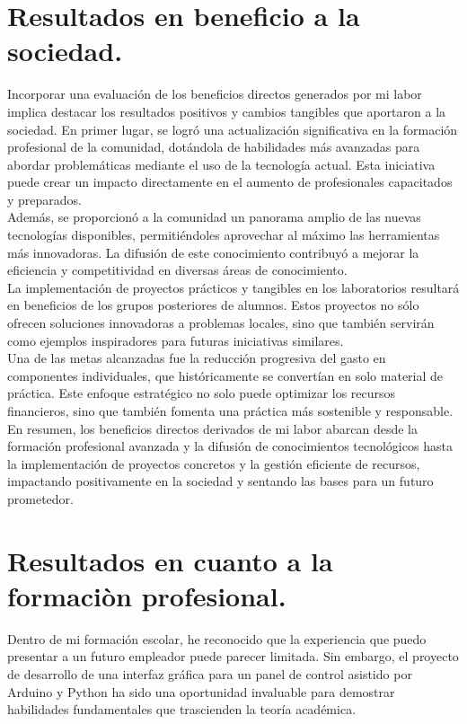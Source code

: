 \documentclass[a4paper,12pt]{article}
\begin{document}
    \section{Resultados en beneficio a la sociedad.}
    Incorporar una evaluación de los beneficios directos generados por mi labor implica destacar los resultados positivos y cambios tangibles que aportaron a la sociedad. En primer lugar, se logró una actualización significativa en la formación profesional de la comunidad, dotándola de habilidades más avanzadas para abordar problemáticas mediante el uso de la tecnología actual. Esta iniciativa puede crear un impacto directamente en el aumento de profesionales capacitados y preparados.\\
    Además, se proporcionó a la comunidad un panorama amplio de las nuevas tecnologías disponibles, permitiéndoles aprovechar al máximo las herramientas más innovadoras. La difusión de este conocimiento contribuyó a mejorar la eficiencia y competitividad en diversas áreas de conocimiento.\\
    La implementación de proyectos prácticos y tangibles en los laboratorios resultará en beneficios de los grupos posteriores de alumnos. Estos proyectos no sólo ofrecen soluciones innovadoras a problemas locales, sino que también servirán como ejemplos inspiradores para futuras iniciativas similares.\\
    Una de las metas alcanzadas fue la reducción progresiva del gasto en componentes individuales, que históricamente se convertían en solo material de práctica. Este enfoque estratégico no solo puede optimizar los recursos financieros, sino que también fomenta una práctica más sostenible y responsable.\\
    En resumen, los beneficios directos derivados de mi labor abarcan desde la formación profesional avanzada y la difusión de conocimientos tecnológicos hasta la implementación de proyectos concretos y la gestión eficiente de recursos, impactando positivamente en la sociedad y sentando las bases para un futuro prometedor.


    \section{Resultados en cuanto a la formaciòn profesional.}
    Dentro de mi formación escolar, he reconocido que la experiencia que puedo presentar a un futuro empleador puede parecer limitada. Sin embargo, el proyecto de desarrollo de una interfaz gráfica para un panel de control asistido por Arduino y Python ha sido una oportunidad invaluable para demostrar habilidades fundamentales que trascienden la teoría académica.
\end{document}
